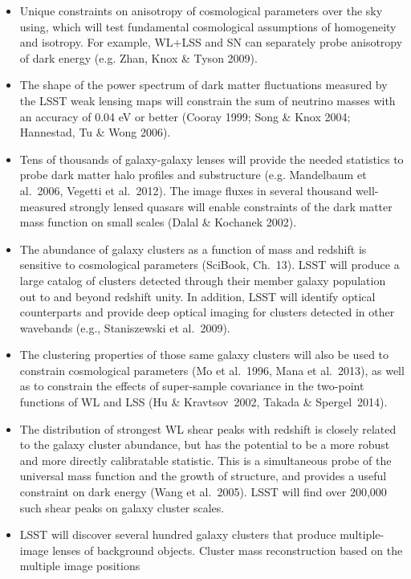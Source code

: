 \begin{itemize}
\item Unique constraints on anisotropy of cosmological parameters over the sky using, which will test fundamental cosmological assumptions of homogeneity and isotropy.
For example, WL$+$LSS and SN can separately probe anisotropy of dark energy (e.g. Zhan, Knox \& Tyson 2009).
\item The shape of the power spectrum of dark matter fluctuations measured by
the LSST weak lensing maps will constrain the sum of neutrino masses with an accuracy
of 0.04 eV or better (Cooray 1999; Song \& Knox 2004; Hannestad, Tu \& Wong 2006).
\item Tens of thousands of galaxy-galaxy lenses will provide the needed statistics to probe dark matter
halo profiles and substructure (e.g. Mandelbaum et al.~2006, Vegetti et al.~2012). The image fluxes in several thousand well-measured
strongly lensed quasars will enable constraints of the dark matter mass function on small scales (Dalal \& Kochanek 2002).
\item The abundance of galaxy clusters as a function of mass and redshift is sensitive to cosmological parameters
(SciBook, Ch.~13). LSST will produce a large catalog of clusters detected through their member galaxy population
out to and beyond redshift unity.  In addition, LSST will identify optical counterparts and provide deep optical
imaging for clusters detected in other wavebands (e.g., Staniszewski et al.~2009).
\item The clustering properties of those same galaxy clusters will also be used to constrain cosmological parameters (Mo et al.~1996, Mana et al.~2013), as well as to constrain the effects of super-sample covariance in the two-point functions of WL and LSS (Hu \& Kravtsov~2002, Takada \& Spergel~2014).
\item The distribution of strongest WL shear peaks with redshift is
  closely related to the galaxy cluster abundance, but has the
  potential to be a more robust and more directly calibratable statistic. This is a simultaneous
probe of the universal mass function and the growth of structure, and provides a useful
constraint on dark energy (Wang et al.~2005). LSST will find over 200,000 such
shear peaks on galaxy cluster scales.
\item LSST will discover several hundred galaxy clusters that produce multiple-image lenses of background objects.
Cluster mass reconstruction based on the multiple image positions

\end{itemize}

